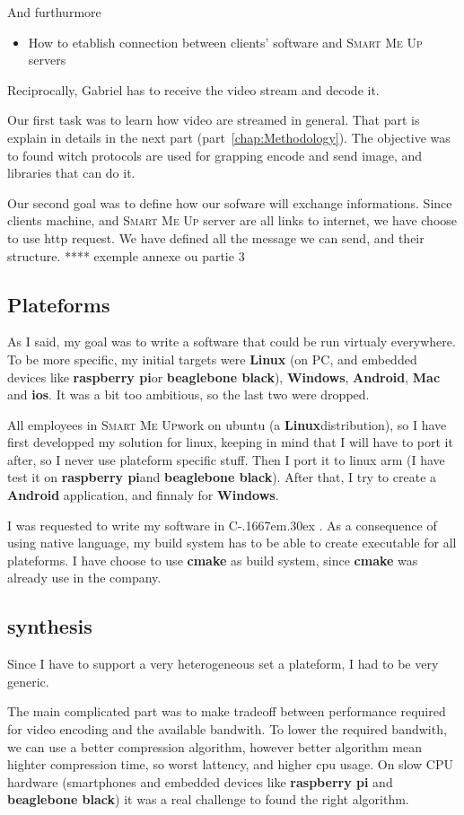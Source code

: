 \documentclass[a4paper,11pt]{custom}
\newcommand{\smu}{\textsc{Smart Me Up}}
\newcommand{\cmake}{\textbf{cmake}}
\newcommand{\rpi}{\textbf{raspberry pi}}
\newcommand{\bbb}{\textbf{beaglebone black}}
\newcommand{\linux}{\textbf{Linux}}
\newcommand{\win}{\textbf{Windows}}
\newcommand{\mac}{\textbf{Mac}}
\newcommand{\android}{\textbf{Android}}
\newcommand{\ios}{\textbf{ios}}
\newcommand{\cpp}{%
  C\kern-.1667em\raise.30ex\hbox{\smaller{++}}%
  \spacefactor1000%
}
\begin{document}
And furthurmore
\begin{itemize}
\item How to etablish connection between clients' software and \smu{} servers
\end{itemize}

Reciprocally, Gabriel has to receive the video stream and decode it.

Our first task was to learn how video are streamed in general. That part is
explain in details in the next part (part~\ref{chap:Methodology}). The objective
was to found witch protocols are used for grapping encode and send image, and
libraries that can do it.

Our second goal was to define how our sofware will exchange informations. Since
clients machine, and \smu{} server are all links to internet, we have choose to
use http request. We have defined all the message we can send, and their
structure. **** exemple annexe ou partie 3

\subsection{Plateforms}

As I said, my goal was to write a software that could be run virtualy
everywhere. To be more specific, my initial targets were \linux{} (on PC, and
embedded devices like \rpi or \bbb), \win, \android, \mac{} and \ios. It was a
bit too ambitious, so the last two were dropped.

All employees in \smu work on ubuntu (a \linux distribution), so I have first
developped my solution for linux, keeping in mind that I will have to port it
after, so I never use plateform specific stuff. Then I port it to linux arm (I
have test it on \rpi and \bbb). After that, I try to create a \android
application, and finnaly for \win.

I was requested to write my software in \cpp. As a consequence of using native
language, my build system has to be able to create executable for all
plateforms. I have choose to use \cmake{} as build system, since \cmake{} was
already use in the company.

\subsection{synthesis}

Since I have to support a very heterogeneous set a plateform, I had to be very
generic.

The main complicated part was to make tradeoff between performance required for
video encoding and the available bandwith. To lower the required bandwith, we
can use a better compression algorithm, however better algorithm mean highter
compression time, so worst lattency, and higher cpu usage. On slow CPU hardware
(smartphones and embedded devices like \rpi{} and \bbb{}) it was a real
challenge to found the right algorithm.
\end{document}
